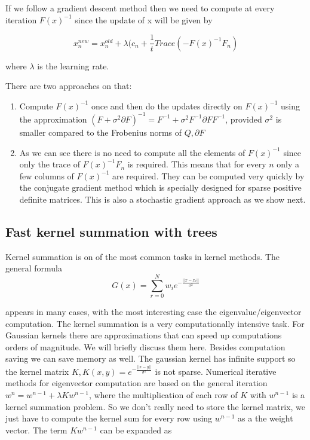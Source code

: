 \documentclass[12pt,letterpaper,doublespaced,ETD,dvips,proposal]{gtthesis}
\begin{document}
\begin{Body}
If we follow a gradient descent method then we need to compute at
every iteration $F(x)^{-1}$ since the update of x will be given by

\begin{equation}
x_{n}^{new}=x_{n}^{old}+\lambda (c_n
+\frac{1}{t}Trace(-F(x)^{-1}F_n)
\end{equation}

where $\lambda$ is the learning rate.

There are two approaches on that:
\begin{enumerate}
  \item Compute $F(x)^{-1}$ once and then do the updates directly on
  $F(x)^{-1}$ using the approximation $(F+ \sigma^2\partial F)^{-1}
  = F^{-1} + \sigma^2 F^{-1}\partial F F^{-1}$, provided $\sigma^2$
  is smaller compared to the Frobenius norms of $Q, \partial F$
  \item As we can see there is no need to compute all the elements
  of $F(x)^{-1}$ since only the trace of $F(x)^{-1}F_n$ is required.
  This means that for every $n$ only a few columns of $F(x)^{-1}$
  are required. They can be computed very quickly by the conjugate
  gradient method which is specially designed for sparse positive
  definite matrices. This is also a stochastic gradient approach as
  we show next.
\end{enumerate}

\subsection{Fast kernel summation with trees} Kernel summation is
on of the most common tasks in kernel methods. The general formula
\begin{equation}
\label{kernel_sum}
  G(x)=\sum_{r=0}^{N} w_i e^{-\frac{||x-x_r||}{\sigma^2}}
\end{equation}

appears in many cases, with the most interesting case the
eigenvalue/eigenvector computation. The kernel summation is a very
computationally intensive task. For Gaussian kernels there are
approximations that can speed up computations orders of magnitude.
We will briefly discuss them here. Besides computation saving we can
save memory as well. The gaussian kernel has infinite support so the
kernel matrix $K, K(x,y)=e^{-\frac{||x-y||}{\sigma^2}}$ is not
sparse. Numerical iterative methods for eigenvector computation are
based on the general iteration $w^n=w^{n-1}+\lambda Kw^{n-1}$, where
the multiplication of each row of $K$ with $w^{n-1}$ is a kernel
summation problem. So we don't really need to store the kernel
matrix, we just have to compute the kernel sum for every row using
$w^{n-1}$ as a the weight vector. The term $Kw^{n-1}$ can be
expanded as


\end{Body}
\end{document}
